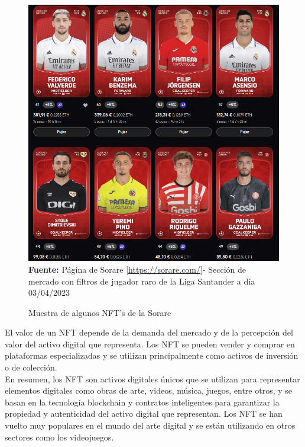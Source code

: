 \begin{figure}[htb!]
    \caption{Muestra de algunos NFT's de la Sorare}
    \label{fig:sorare-nft}
    \centering
    \includegraphics[scale=0.5]{./Ilustraciones/sorare-nft.png}\\
    \textbf{Fuente:} Página de Sorare [\url{https://sorare.com/}]- Sección de mercado con 
    filtros de jugador raro de la Liga Santander a día 03/04/2023
\end{figure}
El valor de un NFT depende de la demanda del mercado y de la percepción del 
valor del activo digital que representa. Los NFT se pueden vender y comprar 
en plataformas especializadas y se utilizan principalmente como activos de 
inversión o de colección.\\
\hfill \break
En resumen, los NFT son activos digitales únicos que se utilizan para 
representar elementos digitales como obras de arte, videos, música, juegos, 
entre otros, y se basan en la tecnología blockchain y contratos inteligentes 
para garantizar la propiedad y autenticidad del activo digital que representan. 
Los NFT se han vuelto muy populares en el mundo del arte digital y se están 
utilizando en otros sectores como los videojuegos\cite{xatakaNFT}.\\
\hfill \break